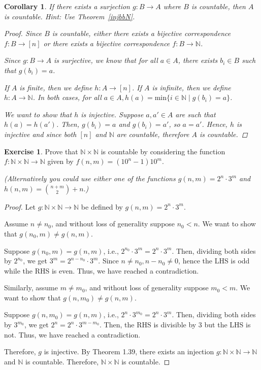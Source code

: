 \documentclass[11pt]{article}
\newcommand{\bbN}{\mathbb{N}}
\newtheorem{corollary}[theorem]{Corollary}
\theoremstyle{definition}
\newtheorem{exercise}[theorem]{Exercise}
\numberwithin{equation}{subsection}
\begin{document}
\begin{corollary}
  If there exists a surjection $g\colon B\to A$ where $B$ is countable, then $A$ is countable. {\it
    Hint: Use Theorem~\ref{injbbN}.}

\begin{proof}
Since $B$ is countable, either there exists a bijective correspondence $f\colon B \rightarrow [n]$ or there exists a bijective correspondence $f\colon B \rightarrow \bbN$.

Since $g \colon B \rightarrow A$ is surjective, we know that for all $a \in A$, there exists $b_i \in B$ such that $g(b_i)=a$.

If $A$ is finite, then we define $h \colon A \rightarrow [n]$. If $A$ is infinite, then we define $h \colon A \rightarrow \bbN$. In both cases, for all $a \in A, h(a) = \text{min}\{i \in \bbN \mid g(b_i)=a\}$.

We want to show that $h$ is injective. Suppose $a, a' \in A$ are such that $h(a)=h(a')$. Then, $g(b_i)=a$ and $g(b_i)=a'$, so $a=a'$. Hence, $h$ is injective and since both $[n]$ and $\bbN$ are countable, therefore $A$ is countable.


\renewcommand\qedsymbol{QED}
\end{proof}
\end{corollary}

\begin{exercise}
Prove that $\bbN\times \bbN$ is countable by considering the function $f:\bbN\times\bbN\longrightarrow \bbN$ given by $f(n,m)=(10^n-1)10^m$.

{\em (Alternatively you could use either one of the functions $  g(n,m) = 2^n\cdot 3^m$ and 
  $h(n,m)  = \binom{n+m}{2} + n.$)}

\begin{proof}

Let $g \colon \bbN\times \bbN \rightarrow \bbN$ be defined by $g(n,m) = 2^n\cdot 3^m$. 

Assume $n \not = n_0$, and without loss of generality suppose $n_0 < n$. We want to show that $g(n_0,m) \not = g(n,m)$. 

Suppose $g(n_0,m) = g(n,m)$, i.e., $2^{n_0}\cdot 3^m = 2^{n}\cdot 3^m$. Then, dividing both sides by $2^{n_0}$, we get $3^m = 2^{n-n_0} \cdot 3^m$. Since $n \not= n_0, n-n_0 \not = 0$, hence the LHS is odd while the RHS is even. Thus, we have reached a contradiction.

Similarly, assume $m \not = m_0$, and without loss of generality suppose $m_0 < m$. We want to show that $g(n,m_0) \not = g(n,m)$.

Suppose $g(n,m_0) = g(n,m)$, i.e., $2^{n}\cdot 3^{m_0} = 2^{n}\cdot 3^m$. Then, dividing both sides by $3^{m_0}$, we get $2^n = 2^{n} \cdot 3^{m-m_0}$. Then, the RHS is divisible by 3 but the LHS is not. Thus, we have reached a contradiction.

Therefore, $g$ is injective. By Theorem 1.39, there exists an injection $g \colon \bbN\times \bbN \rightarrow \bbN$ and $\bbN$ is countable. Therefore, $\bbN\times \bbN$ is countable.

\renewcommand\qedsymbol{QED}
\end{proof}
\end{exercise}
\bigskip
\end{document}
